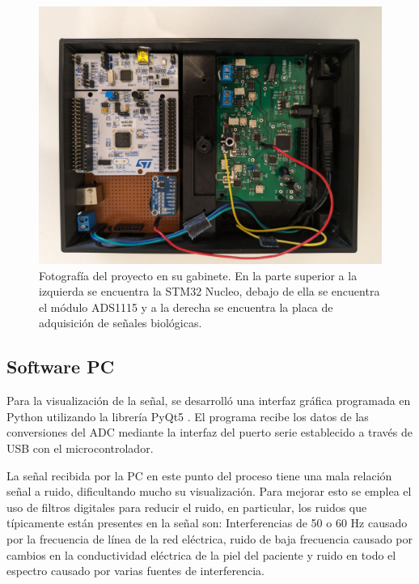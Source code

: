 \documentclass[conference]{IEEEtran}
\begin{document}
\begin{figure}[h]
    \centerline{\includegraphics[width=\linewidth]{figs/foto_proyecto.jpeg}}
    \caption{Fotografía del proyecto en su gabinete. En la parte superior a la
    izquierda se encuentra la STM32 Nucleo, debajo de ella se encuentra el
    módulo ADS1115 y a la derecha se encuentra la placa de adquisición de
    señales biológicas. }
    \label{fig:foto_proyecto}
    \end{figure}

\subsection{Software PC}\label{software-pc}

Para la visualización de la señal, se desarrolló una interfaz gráfica programada
en Python utilizando la librería PyQt5  \cite{pyqt5}. El programa recibe los
datos de las conversiones del ADC mediante la interfaz del puerto serie
establecido a través de USB con el microcontrolador.

La señal recibida por la PC en este punto del proceso tiene una mala relación
señal a ruido, dificultando mucho su visualización. Para mejorar esto se emplea
el uso de filtros digitales para reducir el ruido, en particular, los ruidos que
típicamente están presentes en la señal son: Interferencias de 50 o 60 Hz
causado por la frecuencia de línea de la red eléctrica, ruido de baja frecuencia
causado por cambios en la conductividad eléctrica de la piel del paciente y
ruido en todo el espectro causado por varias fuentes de interferencia.
\cite{ecg_noise}
\end{document}
